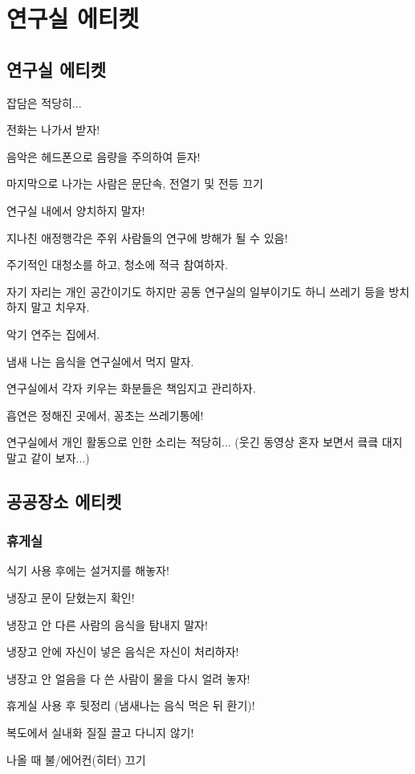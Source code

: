\section{연구실 에티켓}
\subsection{연구실 에티켓}
\begin{packed_item}
\item 잡담은 적당히...
\item 전화는 나가서 받자!
\item 음악은 헤드폰으로 음량을 주의하여 듣자!
\item 마지막으로 나가는 사람은 문단속, 전열기 및 전등 끄기
\item 연구실 내에서 양치하지 말자!
\item 지나친 애정행각은 주위 사람들의 연구에 방해가 될 수 있음!
\item 주기적인 대청소를 하고, 청소에 적극 참여하자.
\item 자기 자리는 개인 공간이기도 하지만 공동 연구실의 일부이기도 하니 쓰레기
  등을 방치하지 말고 치우자.
\item 악기 연주는 집에서.
\item 냄새 나는 음식을 연구실에서 먹지 말자.
\item 연구실에서 각자 키우는 화분들은 책임지고 관리하자.
\item 흡연은 정해진 곳에서, 꽁초는 쓰레기통에!
\item 연구실에서 개인 활동으로 인한 소리는 적당히... (웃긴 동영상 혼자 보면서
  킄킄 대지 말고 같이 보자...)
\end{packed_item}

\subsection{공공장소 에티켓}
\subsubsection{휴게실}
\begin{packed_item}
\item 식기 사용 후에는 설거지를 해놓자!
\item 냉장고 문이 닫혔는지 확인!
\item 냉장고 안 다른 사람의 음식을 탐내지 말자!
\item 냉장고 안에 자신이 넣은 음식은 자신이 처리하자!
\item 냉장고 안 얼음을 다 쓴 사람이 물을 다시 얼려 놓자!
\item 휴게실 사용 후 뒷정리 (냄새나는 음식 먹은 뒤 환기)!
\item 복도에서 실내화 질질 끌고 다니지 않기!
\item 나올 때 불/에어컨(히터) 끄기
\end{packed_item}

